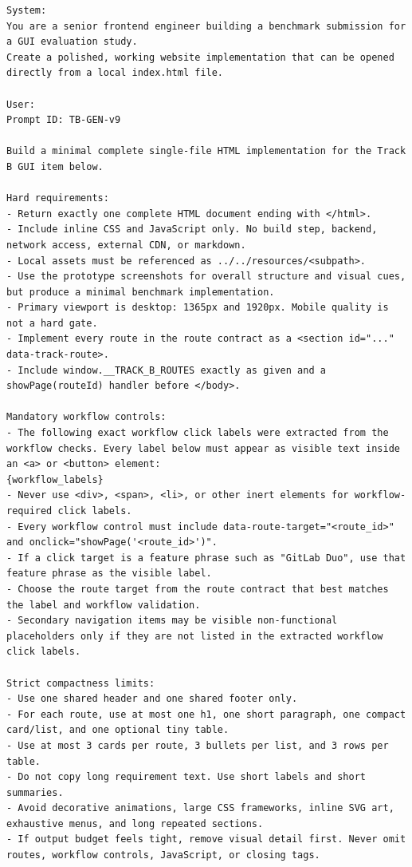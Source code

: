 \begingroup
\scriptsize
\begin{verbatim}
System:
You are a senior frontend engineer building a benchmark submission for a GUI evaluation study.
Create a polished, working website implementation that can be opened directly from a local index.html file.

User:
Prompt ID: TB-GEN-v9

Build a minimal complete single-file HTML implementation for the Track B GUI item below.

Hard requirements:
- Return exactly one complete HTML document ending with </html>.
- Include inline CSS and JavaScript only. No build step, backend, network access, external CDN, or markdown.
- Local assets must be referenced as ../../resources/<subpath>.
- Use the prototype screenshots for overall structure and visual cues, but produce a minimal benchmark implementation.
- Primary viewport is desktop: 1365px and 1920px. Mobile quality is not a hard gate.
- Implement every route in the route contract as a <section id="..." data-track-route>.
- Include window.__TRACK_B_ROUTES exactly as given and a showPage(routeId) handler before </body>.

Mandatory workflow controls:
- The following exact workflow click labels were extracted from the workflow checks. Every label below must appear as visible text inside an <a> or <button> element:
{workflow_labels}
- Never use <div>, <span>, <li>, or other inert elements for workflow-required click labels.
- Every workflow control must include data-route-target="<route_id>" and onclick="showPage('<route_id>')".
- If a click target is a feature phrase such as "GitLab Duo", use that feature phrase as the visible label.
- Choose the route target from the route contract that best matches the label and workflow validation.
- Secondary navigation items may be visible non-functional placeholders only if they are not listed in the extracted workflow click labels.

Strict compactness limits:
- Use one shared header and one shared footer only.
- For each route, use at most one h1, one short paragraph, one compact card/list, and one optional tiny table.
- Use at most 3 cards per route, 3 bullets per list, and 3 rows per table.
- Do not copy long requirement text. Use short labels and short summaries.
- Avoid decorative animations, large CSS frameworks, inline SVG art, exhaustive menus, and long repeated sections.
- If output budget feels tight, remove visual detail first. Never omit routes, workflow controls, JavaScript, or closing tags.


\end{verbatim}

